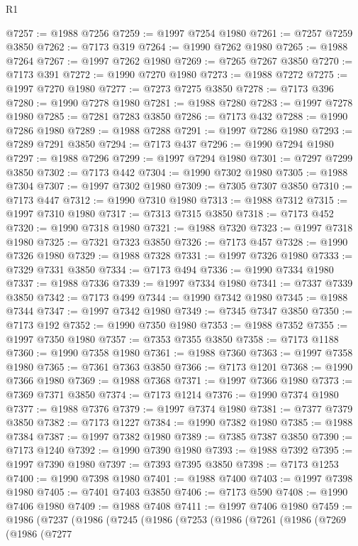 \begin{lexlean}{R1}
\begin{coremodule}
@7257 := @1988 @7256
@7259 := @1997 @7254 @1980
@7261 := @7257 @7259 @3850
@7262 := @7173 @319
@7264 := @1990 @7262 @1980
@7265 := @1988 @7264
@7267 := @1997 @7262 @1980
@7269 := @7265 @7267 @3850
@7270 := @7173 @391
@7272 := @1990 @7270 @1980
@7273 := @1988 @7272
@7275 := @1997 @7270 @1980
@7277 := @7273 @7275 @3850
@7278 := @7173 @396
@7280 := @1990 @7278 @1980
@7281 := @1988 @7280
@7283 := @1997 @7278 @1980
@7285 := @7281 @7283 @3850
@7286 := @7173 @432
@7288 := @1990 @7286 @1980
@7289 := @1988 @7288
@7291 := @1997 @7286 @1980
@7293 := @7289 @7291 @3850
@7294 := @7173 @437
@7296 := @1990 @7294 @1980
@7297 := @1988 @7296
@7299 := @1997 @7294 @1980
@7301 := @7297 @7299 @3850
@7302 := @7173 @442
@7304 := @1990 @7302 @1980
@7305 := @1988 @7304
@7307 := @1997 @7302 @1980
@7309 := @7305 @7307 @3850
@7310 := @7173 @447
@7312 := @1990 @7310 @1980
@7313 := @1988 @7312
@7315 := @1997 @7310 @1980
@7317 := @7313 @7315 @3850
@7318 := @7173 @452
@7320 := @1990 @7318 @1980
@7321 := @1988 @7320
@7323 := @1997 @7318 @1980
@7325 := @7321 @7323 @3850
@7326 := @7173 @457
@7328 := @1990 @7326 @1980
@7329 := @1988 @7328
@7331 := @1997 @7326 @1980
@7333 := @7329 @7331 @3850
@7334 := @7173 @494
@7336 := @1990 @7334 @1980
@7337 := @1988 @7336
@7339 := @1997 @7334 @1980
@7341 := @7337 @7339 @3850
@7342 := @7173 @499
@7344 := @1990 @7342 @1980
@7345 := @1988 @7344
@7347 := @1997 @7342 @1980
@7349 := @7345 @7347 @3850
@7350 := @7173 @192
@7352 := @1990 @7350 @1980
@7353 := @1988 @7352
@7355 := @1997 @7350 @1980
@7357 := @7353 @7355 @3850
@7358 := @7173 @1188
@7360 := @1990 @7358 @1980
@7361 := @1988 @7360
@7363 := @1997 @7358 @1980
@7365 := @7361 @7363 @3850
@7366 := @7173 @1201
@7368 := @1990 @7366 @1980
@7369 := @1988 @7368
@7371 := @1997 @7366 @1980
@7373 := @7369 @7371 @3850
@7374 := @7173 @1214
@7376 := @1990 @7374 @1980
@7377 := @1988 @7376
@7379 := @1997 @7374 @1980
@7381 := @7377 @7379 @3850
@7382 := @7173 @1227
@7384 := @1990 @7382 @1980
@7385 := @1988 @7384
@7387 := @1997 @7382 @1980
@7389 := @7385 @7387 @3850
@7390 := @7173 @1240
@7392 := @1990 @7390 @1980
@7393 := @1988 @7392
@7395 := @1997 @7390 @1980
@7397 := @7393 @7395 @3850
@7398 := @7173 @1253
@7400 := @1990 @7398 @1980
@7401 := @1988 @7400
@7403 := @1997 @7398 @1980
@7405 := @7401 @7403 @3850
@7406 := @7173 @590
@7408 := @1990 @7406 @1980
@7409 := @1988 @7408
@7411 := @1997 @7406 @1980
@7459 := @1986
    (@7237
      (@1986
        (@7245
          (@1986
            (@7253
              (@1986
                (@7261
                  (@1986
                    (@7269
                      (@1986
                        (@7277

\end{coremodule}
\end{lexlean}
